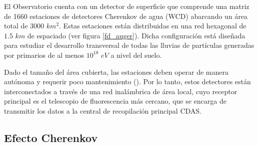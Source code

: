 El Observatorio cuenta con un detector de superficie que comprende una matriz de 1660 estaciones de detectores Cherenkov de agua (WCD) abarcando un área total de $3000$ $km^{2}$. Estas estaciones están distribuidas en una red hexagonal de $1.5$ $km$ de espaciado (ver figura \ref{fd_auger}). Dicha configuración está diseñada para estudiar el desarrollo transversal de todas las lluvias de partículas generadas por primarios de al menos $10^{18}$ $eV$ a nivel del suelo.

Dado el tamaño del área cubierta, las estaciones deben operar de manera autónoma y requerir poco mantenimiento (\cite{allekotte_2008}). Por lo tanto, estos detectores están interconectados a través de una red inalámbrica de área local, cuyo receptor principal es el telescopio de fluorescencia más cercano, que se encarga de transmitir los datos a la central de recopilación principal CDAS.

\subsection{Efecto Cherenkov}


